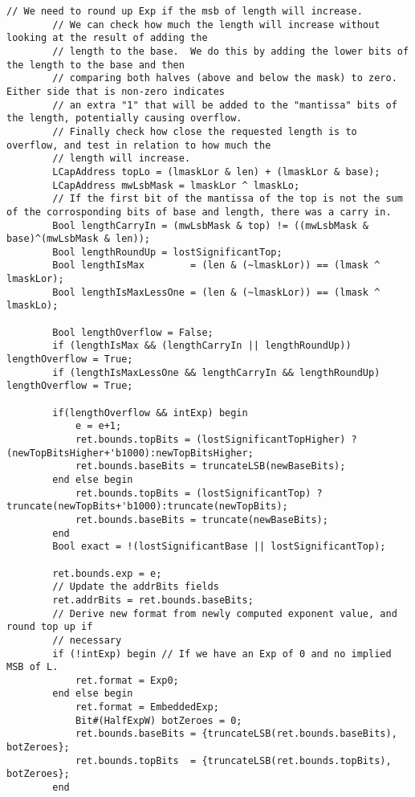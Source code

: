 \begin{lstlisting}[language=bluespec]
        // We need to round up Exp if the msb of length will increase.
        // We can check how much the length will increase without looking at the result of adding the
        // length to the base.  We do this by adding the lower bits of the length to the base and then
        // comparing both halves (above and below the mask) to zero.  Either side that is non-zero indicates
        // an extra "1" that will be added to the "mantissa" bits of the length, potentially causing overflow.
        // Finally check how close the requested length is to overflow, and test in relation to how much the
        // length will increase.
        LCapAddress topLo = (lmaskLor & len) + (lmaskLor & base);
        LCapAddress mwLsbMask = lmaskLor ^ lmaskLo;
        // If the first bit of the mantissa of the top is not the sum of the corrosponding bits of base and length, there was a carry in.
        Bool lengthCarryIn = (mwLsbMask & top) != ((mwLsbMask & base)^(mwLsbMask & len));
        Bool lengthRoundUp = lostSignificantTop;
        Bool lengthIsMax        = (len & (~lmaskLor)) == (lmask ^ lmaskLor);
        Bool lengthIsMaxLessOne = (len & (~lmaskLor)) == (lmask ^ lmaskLo);

        Bool lengthOverflow = False;
        if (lengthIsMax && (lengthCarryIn || lengthRoundUp)) lengthOverflow = True;
        if (lengthIsMaxLessOne && lengthCarryIn && lengthRoundUp) lengthOverflow = True;

        if(lengthOverflow && intExp) begin
            e = e+1;
            ret.bounds.topBits = (lostSignificantTopHigher) ? (newTopBitsHigher+'b1000):newTopBitsHigher;
            ret.bounds.baseBits = truncateLSB(newBaseBits);
        end else begin
            ret.bounds.topBits = (lostSignificantTop) ? truncate(newTopBits+'b1000):truncate(newTopBits);
            ret.bounds.baseBits = truncate(newBaseBits);
        end
        Bool exact = !(lostSignificantBase || lostSignificantTop);

        ret.bounds.exp = e;
        // Update the addrBits fields
        ret.addrBits = ret.bounds.baseBits;
        // Derive new format from newly computed exponent value, and round top up if
        // necessary
        if (!intExp) begin // If we have an Exp of 0 and no implied MSB of L.
            ret.format = Exp0;
        end else begin
            ret.format = EmbeddedExp;
            Bit#(HalfExpW) botZeroes = 0;
            ret.bounds.baseBits = {truncateLSB(ret.bounds.baseBits), botZeroes};
            ret.bounds.topBits  = {truncateLSB(ret.bounds.topBits), botZeroes};
        end


\end{lstlisting}
